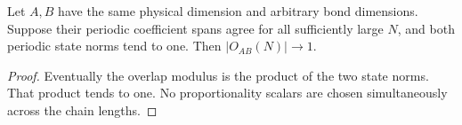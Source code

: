 \begin{lemma}
    \label{thm:spc_aux_periodic_line_unit_overlap}
    \leanok
    Let $A,B$ have the same physical dimension and arbitrary bond dimensions.
    Suppose their periodic coefficient spans agree for all sufficiently
    large $N$, and both periodic state norms tend to one.
    Then $|O_{AB}(N)|\to1$.
\end{lemma}
\begin{proof}\leanok
    Eventually the overlap modulus is the product of the two state norms.
    That product tends to one. No proportionality scalars are chosen
    simultaneously across the chain lengths.
\end{proof}

